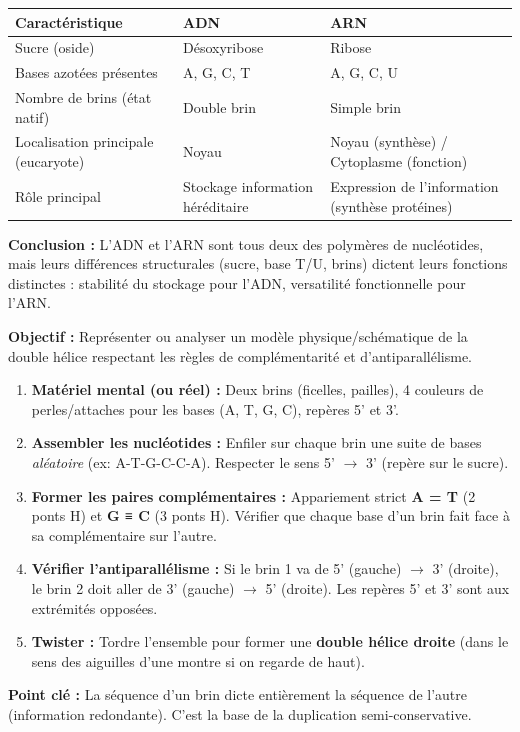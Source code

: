 \documentclass[11pt]{article}
\newcommand{\cle}[1]{{\popxbold\color{popdark}#1}}
\begin{document}
\begin{exoresolu}
\begin{enumerate}
    \end{enumerate}
    \begin{center}
        \begin{tabularx}{\linewidth}{|l|X|X|}\hline
            \rowcolor{popblueL} \textbf{Caractéristique} & \textbf{ADN} & \textbf{ARN} \\ \hline
            Sucre (oside) & Désoxyribose & Ribose \\ \hline
            Bases azotées présentes & A, G, C, T & A, G, C, U \\ \hline
            Nombre de brins (état natif) & Double brin & Simple brin \\ \hline
            Localisation principale (eucaryote) & Noyau & Noyau (synthèse) / Cytoplasme (fonction) \\ \hline
            Rôle principal & Stockage information héréditaire & Expression de l'information (synthèse protéines) \\ \hline
        \end{tabularx}
    \end{center}
    \textbf{Conclusion :} L'ADN et l'ARN sont tous deux des polymères de nucléotides, mais leurs différences structurales (sucre, base T/U, brins) dictent leurs fonctions distinctes : stabilité du stockage pour l'ADN, versatilité fonctionnelle pour l'ARN.
\end{exoresolu}

\begin{methode}
    \textbf{Objectif :} Représenter ou analyser un modèle physique/schématique de la double hélice respectant les règles de \cle{complémentarité} et d'\cle{antiparallélisme}.
    \begin{enumerate}
        \item \textbf{Matériel mental (ou réel) :} Deux brins (ficelles, pailles), 4 couleurs de perles/attaches pour les bases (A, T, G, C), repères 5' et 3'.
        \item \textbf{Assembler les nucléotides :} Enfiler sur chaque brin une suite de bases \emph{aléatoire} (ex: A-T-G-C-C-A). Respecter le sens 5' $\rightarrow$ 3' (repère sur le sucre).
        \item \textbf{Former les paires complémentaires :} Appariement strict \textbf{A = T} (2 ponts H) et \textbf{G ≡ C} (3 ponts H). Vérifier que chaque base d'un brin fait face à sa complémentaire sur l'autre.
        \item \textbf{Vérifier l'antiparallélisme :} Si le brin 1 va de 5' (gauche) $\rightarrow$ 3' (droite), le brin 2 doit aller de 3' (gauche) $\rightarrow$ 5' (droite). Les repères 5' et 3' sont aux extrémités opposées.
        \item \textbf{Twister :} Tordre l'ensemble pour former une \textbf{double hélice droite} (dans le sens des aiguilles d'une montre si on regarde de haut).
    \end{enumerate}
    \textbf{Point clé :} La séquence d'un brin dicte entièrement la séquence de l'autre (information redondante). C'est la base de la \cle{duplication semi-conservative}.
\end{methode}
\end{document}
